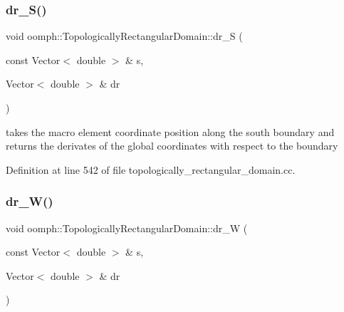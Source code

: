 \mbox{\label{classoomph_1_1TopologicallyRectangularDomain_a24a20bc9749166ca61bd4373bc381680}} 
\subsubsection{\texorpdfstring{dr\+\_\+\+S()}{dr\_S()}}
{\footnotesize\ttfamily void oomph\+::\+Topologically\+Rectangular\+Domain\+::dr\+\_\+S (\begin{DoxyParamCaption}\item[{const Vector$<$ double $>$ \&}]{s,  }\item[{Vector$<$ double $>$ \&}]{dr }\end{DoxyParamCaption})\hspace{0.3cm}{\ttfamily [private]}}



takes the macro element coordinate position along the south boundary and returns the derivates of the global coordinates with respect to the boundary 



Definition at line 542 of file topologically\+\_\+rectangular\+\_\+domain.\+cc.

\mbox{\label{classoomph_1_1TopologicallyRectangularDomain_a91b92399343513aed5cfa65a8377b01a}} 
\subsubsection{\texorpdfstring{dr\+\_\+\+W()}{dr\_W()}}
{\footnotesize\ttfamily void oomph\+::\+Topologically\+Rectangular\+Domain\+::dr\+\_\+W (\begin{DoxyParamCaption}\item[{const Vector$<$ double $>$ \&}]{s,  }\item[{Vector$<$ double $>$ \&}]{dr }\end{DoxyParamCaption})\hspace{0.3cm}{\ttfamily [private]}}



